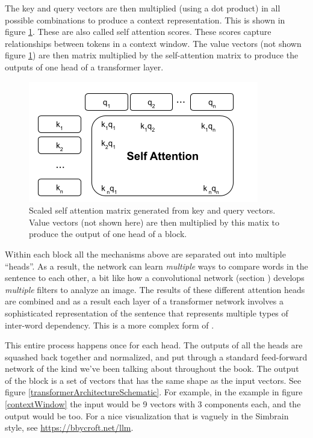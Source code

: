 The key and query vectors are then multiplied (using a dot product) in all possible combinations to produce a context representation.  This is shown in figure \ref{selfAttention}. These are also called self attention scores. These scores capture relationships between tokens in a context window.  The value vectors (not shown figure \ref{selfAttention}) are then matrix multiplied by the self-attention matrix to produce the outputs of one head of a transformer layer.

\begin{figure}[h]
\centering
\includegraphics[scale=.6]{./images/selfAttention.png}
\caption[Jeff Yoshimi with consultation from Tim Meyer.]{Scaled self attention matrix generated from key and query vectors. Value vectors (not shown here) are then multiplied by this matix to produce the output of one head of a block.}
\label{selfAttention}
\end{figure}

Within each block all the mechanisms above are separated out into multiple ``heads''. As a result, the network can learn \emph{multiple} ways to compare words in the sentence to each other, a bit like how a convolutional network (section ) develops \emph{multiple} filters to analyze an image.  The results of these different attention heads are combined and as a result each layer of a transformer network involves a sophisticated representation of the sentence that represents multiple types of inter-word dependency. This is a more complex form of .

This entire process happens once for each head. The outputs of all the heads are squashed back together and normalized, and put through a standard feed-forward network of the kind we've been talking about throughout the book. The output of the block is a set of vectors that has the same shape as the input vectors. See figure \ref{transformerArchitectureSchematic}.  For example, in the example in figure \ref{contextWindow} the input would be 9 vectors with 3 components each, and the output would be too. For a nice visualization that is vaguely in the Simbrain style, see \url{https://bbycroft.net/llm}.

